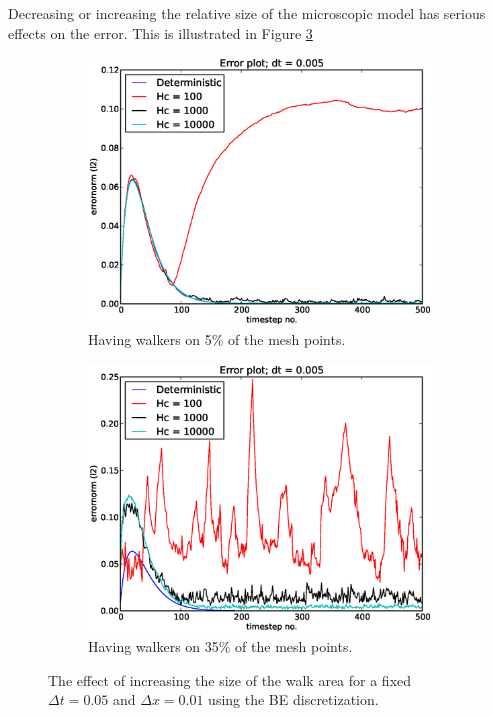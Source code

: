 Decreasing or increasing the relative size of the microscopic model has serious effects on the error. This is illustrated in Figure \ref{testing_walk_area_size_BE}

\begin{figure}[H]
\centering
\begin{subfigure}[b]{0.48\textwidth}
 \includegraphics[width=\textwidth]{../results/experiment_16042014_1139_convergence_tests_etc/results/errorplot.eps}
 \caption{Having walkers on 5\% of the mesh points.}
 \label{errorplot_BE1D_walk_5_percent}
\end{subfigure}
\begin{subfigure}[b]{0.48\textwidth}
 \includegraphics[width=\textwidth]{../results/experiment_16042014_1202_tests_35percent_walkers/results/errorplot.eps}
 \caption{Having walkers on 35\% of the mesh points.}
 \label{errorplot_BE1D_walk_35_percent}
\end{subfigure}
\caption[Effects of increasing relative size of walk area]{The effect of increasing the size of the walk area for a fixed $\Delta t = 0.05$ and $\Delta x = 0.01$ using the BE discretization.}
\label{testing_walk_area_size_BE}
\end{figure}
